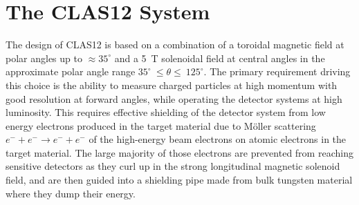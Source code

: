 \documentclass[final,3p,twocolumn]{elsarticle}
\begin{document}
\section{The CLAS12 System}

The design of CLAS12 is based on a combination of a toroidal magnetic field at polar angles up to $\approx 35^\circ$ and
a 5~T solenoidal field at central angles in the approximate polar angle range $35^\circ~\le \theta \le~125^\circ$. The
primary requirement driving this choice is the ability to measure charged particles at high momentum with good resolution
at forward angles, while operating the detector systems at high luminosity. This requires effective shielding of the
detector system from low energy electrons produced in the target material due to M\"oller scattering
$e^- + e^- \to e^- + e^-$ of the high-energy beam electrons on atomic electrons in the target material. The large majority
of those electrons are prevented from reaching sensitive detectors as they curl up in the strong longitudinal magnetic
solenoid field, and are then guided into a shielding pipe made from bulk tungsten material where they dump their energy. 
\end{document}

